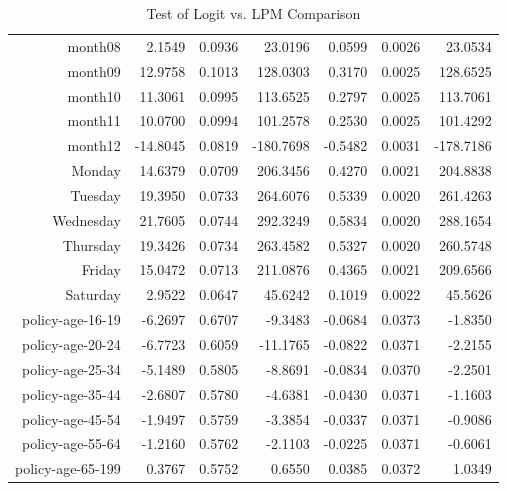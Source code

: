 \documentclass[10pt]{article}
\begin{document}
\begin{table}[ht]
\begin{tabular}{rrrrrrr}
  month08 & 2.1549 & 0.0936 & 23.0196 & 0.0599 & 0.0026 & 23.0534 \\ 
  month09 & 12.9758 & 0.1013 & 128.0303 & 0.3170 & 0.0025 & 128.6525 \\ 
  month10 & 11.3061 & 0.0995 & 113.6525 & 0.2797 & 0.0025 & 113.7061 \\ 
  month11 & 10.0700 & 0.0994 & 101.2578 & 0.2530 & 0.0025 & 101.4292 \\ 
  month12 & -14.8045 & 0.0819 & -180.7698 & -0.5482 & 0.0031 & -178.7186 \\ 
  Monday & 14.6379 & 0.0709 & 206.3456 & 0.4270 & 0.0021 & 204.8838 \\ 
  Tuesday & 19.3950 & 0.0733 & 264.6076 & 0.5339 & 0.0020 & 261.4263 \\ 
  Wednesday & 21.7605 & 0.0744 & 292.3249 & 0.5834 & 0.0020 & 288.1654 \\ 
  Thursday & 19.3426 & 0.0734 & 263.4582 & 0.5327 & 0.0020 & 260.5748 \\ 
  Friday & 15.0472 & 0.0713 & 211.0876 & 0.4365 & 0.0021 & 209.6566 \\ 
  Saturday & 2.9522 & 0.0647 & 45.6242 & 0.1019 & 0.0022 & 45.5626 \\ 
  policy-age-16-19 & -6.2697 & 0.6707 & -9.3483 & -0.0684 & 0.0373 & -1.8350 \\ 
  policy-age-20-24 & -6.7723 & 0.6059 & -11.1765 & -0.0822 & 0.0371 & -2.2155 \\ 
  policy-age-25-34 & -5.1489 & 0.5805 & -8.8691 & -0.0834 & 0.0370 & -2.2501 \\ 
  policy-age-35-44 & -2.6807 & 0.5780 & -4.6381 & -0.0430 & 0.0371 & -1.1603 \\ 
  policy-age-45-54 & -1.9497 & 0.5759 & -3.3854 & -0.0337 & 0.0371 & -0.9086 \\ 
  policy-age-55-64 & -1.2160 & 0.5762 & -2.1103 & -0.0225 & 0.0371 & -0.6061 \\ 
  policy-age-65-199 & 0.3767 & 0.5752 & 0.6550 & 0.0385 & 0.0372 & 1.0349 \\ 
   \hline
\end{tabular}
\caption{Test of Logit vs. LPM Comparison} 
\label{tab:test}
\end{table}
\end{document}
